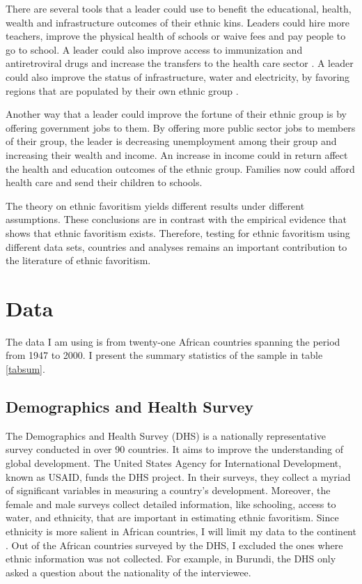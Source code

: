 \documentclass{wptemp}
\begin{document}
There are several tools that a leader could use to benefit the educational, health, wealth and infrastructure outcomes of their ethnic kins. Leaders could hire more teachers, improve the physical health of schools \citep{glewwe2006schools} or waive fees and pay people to go to school. A leader could also improve access to immunization and antiretroviral drugs and increase the transfers to the health care sector \citep{friedman2018corruption, jones2003many}. A leader could also improve the status of infrastructure, water and electricity, by favoring regions that are populated by their own ethnic group \citep{hodler2014regional}.

Another way that a leader could improve the fortune of their ethnic group is by offering government jobs to them. By offering more public sector jobs to members of their group, the leader is decreasing unemployment among their group and increasing their wealth and income. An increase in income could in return affect the health and education outcomes of the ethnic group. Families now could afford health care and send their children to schools. 

The theory on ethnic favoritism yields different results under different assumptions. These conclusions are in contrast with the empirical evidence that shows that ethnic favoritism exists. Therefore, testing for ethnic favoritism using different data sets, countries and analyses remains an important contribution to the literature of ethnic favoritism.

\section{Data}\label{sec2}
The data I am using is from twenty-one African countries spanning the period from 1947 to 2000. I present the summary statistics of the sample in table \ref{tabsum}.

\subsection{Demographics and Health Survey}
The Demographics and Health Survey (DHS) is a nationally representative survey conducted in over 90 countries. It aims to improve the understanding of global development. The United States Agency for International Development, known as USAID, funds the DHS project. In their surveys, they collect a myriad of significant variables in measuring a country's development. Moreover, the female and male surveys collect detailed information, like schooling, access to water, and ethnicity, that are important in estimating ethnic favoritism. Since ethnicity is more salient in African countries, I will limit my data to the continent \citep{murphree1988salience, posner2004political}. Out of the African countries surveyed by the DHS, I excluded the ones where ethnic information was not collected. For example, in Burundi, the DHS only asked a question about the nationality of the interviewee.
\end{document}
